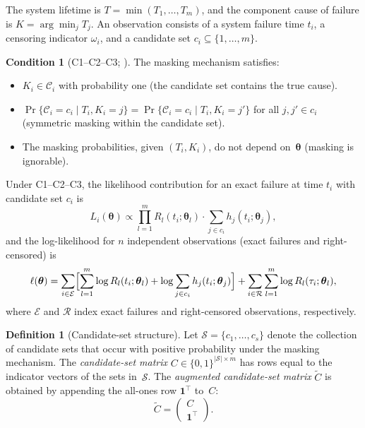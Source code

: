 \documentclass[11pt]{article}
\theoremstyle{definition}
\newtheorem{condition}{Condition}
\newtheorem{definition}{Definition}
\theoremstyle{plain}
\renewcommand{\v}[1]{\boldsymbol{#1}}
\newcommand{\btheta}{\v{\theta}}
\newcommand{\Ctilde}{\tilde{C}}
\begin{document}
The system lifetime is $T = \min(T_1, \ldots, T_m)$, and the
component cause of failure is $K = \arg\min_j T_j$.
An observation consists of a system failure time $t_i$, a censoring
indicator $\omega_i$, and a candidate set $c_i \subseteq \{1, \ldots, m\}$.

\begin{condition}[C1--C2--C3; \citealp{towell2025masked}]
\label{cond:c1c2c3}
The masking mechanism satisfies:
\begin{itemize}[nosep]
    \item[\textbf{C1.}] $K_i \in \mathcal{C}_i$ with probability one
        (the candidate set contains the true cause).
    \item[\textbf{C2.}] $\Pr\{\mathcal{C}_i = c_i \mid T_i, K_i = j\}
        = \Pr\{\mathcal{C}_i = c_i \mid T_i, K_i = j'\}$ for all
        $j, j' \in c_i$ (symmetric masking within the candidate set).
    \item[\textbf{C3.}] The masking probabilities, given $(T_i, K_i)$,
        do not depend on~$\btheta$ (masking is ignorable).
\end{itemize}
\end{condition}

Under C1--C2--C3, the likelihood contribution for an exact failure
at time $t_i$ with candidate set $c_i$ is
\begin{equation}
\label{eq:likelihood-contribution}
    L_i(\btheta) \propto \prod_{l=1}^m R_l(t_i; \v{\theta}_l)
    \cdot \sum_{j \in c_i} h_j(t_i; \v{\theta}_j),
\end{equation}
and the log-likelihood for $n$ independent observations (exact
failures and right-censored) is
\begin{equation}
\label{eq:log-likelihood}
    \ell(\btheta) =
    \sum_{i \in \mathcal{E}} \Bigl[
        \sum_{l=1}^m \log R_l(t_i; \v{\theta}_l)
        + \log \sum_{j \in c_i} h_j(t_i; \v{\theta}_j)
    \Bigr]
    + \sum_{i \in \mathcal{R}}
        \sum_{l=1}^m \log R_l(\tau_i; \v{\theta}_l),
\end{equation}
where $\mathcal{E}$ and $\mathcal{R}$ index exact failures and
right-censored observations, respectively.

\begin{definition}[Candidate-set structure]
\label{def:candidate-set-structure}
Let $\mathcal{S} = \{c_1, \ldots, c_s\}$ denote the collection of
candidate sets that occur with positive probability under the masking
mechanism.
The \emph{candidate-set matrix} $C \in \{0,1\}^{|\mathcal{S}| \times m}$
has rows equal to the indicator vectors of the sets in~$\mathcal{S}$.
The \emph{augmented candidate-set matrix} $\Ctilde$ is obtained by
appending the all-ones row $\v{1}^\top$ to~$C$:
\begin{equation}
    \Ctilde = \begin{pmatrix} C \\ \v{1}^\top \end{pmatrix}.
\end{equation}
\end{definition}
\end{document}
